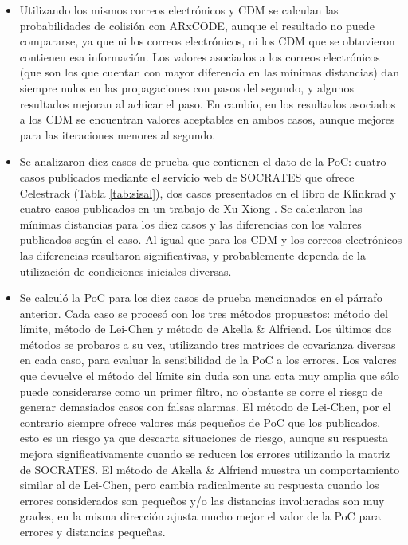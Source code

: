 \begin{itemize}
  \item Utilizando los mismos correos electr\'onicos y CDM se calculan las probabilidades de colisi\'on con ARxCODE, aunque el resultado no puede compararse, ya que ni los correos electr\'onicos, ni los CDM que se obtuvieron contienen esa informaci\'on. Los valores asociados a los correos electr\'onicos (que son los que cuentan con mayor diferencia en las m\'inimas distancias) dan siempre nulos en las propagaciones con pasos del segundo, y algunos resultados mejoran al achicar el paso. En cambio, en los resultados asociados a los CDM se encuentran valores aceptables en ambos casos, aunque mejores para las iteraciones menores al segundo.\\
  \item Se analizaron diez casos de prueba que contienen el dato de la PoC: cuatro casos publicados mediante el servicio web de SOCRATES \citep{Kelso} que ofrece Celestrack (Tabla \ref{tab:sisal}),  dos casos  presentados en el libro de Klinkrad \citep{KlinkradChapter8} y cuatro casos publicados en un trabajo de Xu-Xiong \citep{xu2014method}. Se calcularon las m\'inimas distancias para los diez casos y las diferencias con los valores publicados seg\'un el caso. Al igual que para los CDM y los correos electr\'onicos las diferencias resultaron significativas, y probablemente dependa de la utilizaci\'on de condiciones iniciales diversas. 
  
  \item Se calcul\'o la PoC para los diez casos de prueba mencionados en el p\'arrafo anterior. Cada caso se proces\'o con los tres m\'etodos propuestos: m\'etodo del l\'imite, m\'etodo de Lei-Chen y m\'etodo de Akella \& Alfriend. Los \'ultimos dos m\'etodos se probaros a su vez, utilizando tres matrices de covarianza diversas en cada caso, para evaluar la sensibilidad de la PoC a los errores. Los valores que devuelve el m\'etodo del l\'imite sin duda son una cota muy amplia que s\'olo puede considerarse como un primer filtro, no obstante se corre el riesgo de generar demasiados casos con falsas alarmas. El m\'etodo de Lei-Chen, por el contrario siempre ofrece valores m\'as pequeños de PoC que los publicados, esto es un riesgo ya que descarta situaciones de riesgo, aunque su respuesta mejora significativamente cuando se reducen los errores utilizando la matriz de SOCRATES. El m\'etodo de Akella \& Alfriend muestra un comportamiento similar al de Lei-Chen, pero cambia radicalmente su respuesta cuando los errores considerados son peque\~nos y/o las distancias involucradas son muy grades, en la misma direcci\'on ajusta mucho mejor el valor de la PoC para errores y distancias peque\~nas.\\
  
 \end{itemize}
